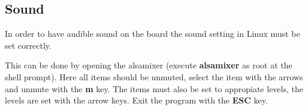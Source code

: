 \subsection{Sound}
\label{sec:alsa}

In order to have audible sound on the board the sound setting in Linux must be set correctly.

This can be done by opening the alsamixer (execute {\bf alsamixer} as root at the shell prompt).
Here all items should be unmuted, select the item with the arrows and unmute with the {\bf m} key.
The items must also be set to appropiate levels, the levels are set with the arrow keys. Exit
the program with the {\bf ESC} key.
